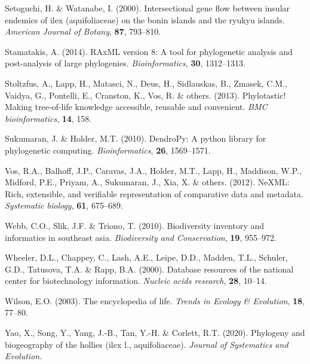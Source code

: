 \documentclass[]{article}
\begin{document}
\leavevmode\hypertarget{ref-setoguchi2000intersectional}{}%
Setoguchi, H. \& Watanabe, I. (2000). Intersectional gene flow between insular endemics of ilex (aquifoliaceae) on the bonin islands and the ryukyu islands. \emph{American Journal of Botany}, \textbf{87}, 793--810.

\leavevmode\hypertarget{ref-stamatakis2014raxml}{}%
Stamatakis, A. (2014). RAxML version 8: A tool for phylogenetic analysis and post-analysis of large phylogenies. \emph{Bioinformatics}, \textbf{30}, 1312--1313.

\leavevmode\hypertarget{ref-stoltzfus2013phylotastic}{}%
Stoltzfus, A., Lapp, H., Matasci, N., Deus, H., Sidlauskas, B., Zmasek, C.M., Vaidya, G., Pontelli, E., Cranston, K., Vos, R. \& others. (2013). Phylotastic! Making tree-of-life knowledge accessible, reusable and convenient. \emph{BMC bioinformatics}, \textbf{14}, 158.

\leavevmode\hypertarget{ref-sukumaran2010dendropy}{}%
Sukumaran, J. \& Holder, M.T. (2010). DendroPy: A python library for phylogenetic computing. \emph{Bioinformatics}, \textbf{26}, 1569--1571.

\leavevmode\hypertarget{ref-vos2012nexml}{}%
Vos, R.A., Balhoff, J.P., Caravas, J.A., Holder, M.T., Lapp, H., Maddison, W.P., Midford, P.E., Priyam, A., Sukumaran, J., Xia, X. \& others. (2012). NeXML: Rich, extensible, and verifiable representation of comparative data and metadata. \emph{Systematic biology}, \textbf{61}, 675--689.

\leavevmode\hypertarget{ref-webb2010biodiversity}{}%
Webb, C.O., Slik, J.F. \& Triono, T. (2010). Biodiversity inventory and informatics in southeast asia. \emph{Biodiversity and Conservation}, \textbf{19}, 955--972.

\leavevmode\hypertarget{ref-wheeler2000database}{}%
Wheeler, D.L., Chappey, C., Lash, A.E., Leipe, D.D., Madden, T.L., Schuler, G.D., Tatusova, T.A. \& Rapp, B.A. (2000). Database resources of the national center for biotechnology information. \emph{Nucleic acids research}, \textbf{28}, 10--14.

\leavevmode\hypertarget{ref-wilson2003encyclopedia}{}%
Wilson, E.O. (2003). The encyclopedia of life. \emph{Trends in Ecology \& Evolution}, \textbf{18}, 77--80.

\leavevmode\hypertarget{ref-yao2020phylogeny}{}%
Yao, X., Song, Y., Yang, J.-B., Tan, Y.-H. \& Corlett, R.T. (2020). Phylogeny and biogeography of the hollies (ilex l., aquifoliaceae). \emph{Journal of Systematics and Evolution}.
\end{document}
